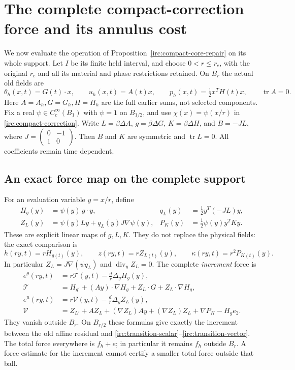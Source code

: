 \section{The complete compact-correction force and its annulus cost}
\label{ifs:section}

We now evaluate the operation of Proposition~\ref{irc:compact-core-repair}
on its whole support.  Let $I$ be its finite held interval, and choose
$0<r\leq r_c$, with the original $r_c$ and all its material and phase
restrictions retained.  On $B_r$ the actual old fields are
\[
 \theta_h(x,t)=G(t)\cdot x,\qquad u_h(x,t)=A(t)x,\qquad
 p_h(x,t)=\tfrac12 x^TH(t)x,\qquad \operatorname{tr}A=0.
\]
Here $A=A_h,G=G_h,H=H_h$ are the full earlier sums, not selected
components.  Fix a real $\psi\in C_c^\infty(B_1)$ with $\psi=1$ on
$B_{1/2}$, and use $\chi(x)=\psi(x/r)$ in
\eqref{irc:compact-correction}.  Write
$L=\beta\Delta A$, $g=\beta\Delta G$, $K=\beta\Delta H$, and
$B=-JL$, where $J=\left(\begin{smallmatrix}0&-1\\1&0\end{smallmatrix}\right)$.
Then $B$ and $K$ are symmetric and $\operatorname{tr}L=0$.
All coefficients remain time dependent.

\subsection{An exact force map on the complete support}

For an evaluation variable $y=x/r$, define
\begin{align}
 H_g(y)&=\psi(y)\,g\cdot y,&
 q_L(y)&=\tfrac12 y^T(-JL)y,\nonumber\\
 Z_L(y)&=\psi(y)Ly+q_L(y)J\nabla\psi(y),&
 P_K(y)&=\tfrac12\psi(y)y^TKy.
 \label{ifs:cutoff-maps}
\end{align}
These are explicit linear maps of $g,L,K$.  They do not replace the
physical fields: the exact comparison is
\begin{equation}\label{ifs:physical-fields}
 h(ry,t)=rH_{g(t)}(y),\qquad
 z(ry,t)=rZ_{L(t)}(y),\qquad
 \kappa(ry,t)=r^2P_{K(t)}(y).
\end{equation}
In particular $Z_L=J\nabla(\psi q_L)$ and
$\operatorname{div}_yZ_L=0$.
The complete \emph{increment} force is
\begin{align}
 e^\theta(ry,t)
 &=r\mathcal T(y,t)-\frac d r\Delta_y H_g(y),\nonumber\\
 \mathcal T
 &=H_{g'}+(Ay)\cdot\nabla H_g
       +Z_L\cdot G+Z_L\cdot\nabla H_g,
 \label{ifs:scalar-force}\\
 e^u(ry,t)
 &=r\mathcal V(y,t)-\frac d r\Delta_y Z_L(y),\nonumber\\
 \mathcal V
 &=Z_{L'}+AZ_L+(\nabla Z_L)Ay
       +(\nabla Z_L)Z_L+\nabla P_K-H_g e_2.
 \label{ifs:vector-force}
\end{align}
They vanish outside $B_r$.  On $B_{r/2}$ these formulas give exactly
the increment between the old affine residual and
\eqref{irc:transition-scalar}--\eqref{irc:transition-vector}.
The total force everywhere is $f_h+e$; in particular it remains $f_h$
outside $B_r$.  A force estimate for the increment cannot certify a
smaller total force outside that ball.

